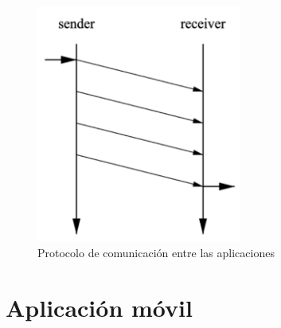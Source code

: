 \begin{figure}[h]
\centering
\includegraphics[width=0.6\textwidth]{Imagenes/Bitmap/UDP-protocol.png}
\caption{Protocolo de comunicaci\'on entre las aplicaciones}
\label{Protocolo Android - Unity}
\end{figure}

\newpage
\section{Aplicaci\'on m\'ovil}
\label{cap4:sec:android}

